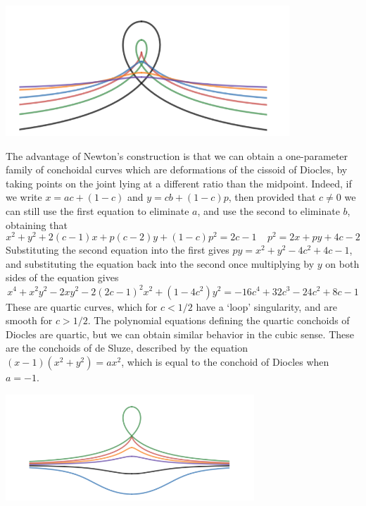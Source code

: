 \begin{example}
    \begin{center}
        \includegraphics[width=0.8\textwidth]{ConchoidDiocles2}
    \end{center}
    The advantage of Newton's construction is that we can obtain a one-parameter family of conchoidal curves which are deformations of the cissoid of Diocles, by taking points on the joint lying at a different ratio than the midpoint. Indeed, if we write $x = ac + (1 - c)$ and $y = cb + (1 - c)p$, then provided that $c \neq 0$ we can still use the first equation to eliminate $a$, and use the second to eliminate $b$, obtaining that
    \[ x^2 + y^2 + 2(c-1)x + p(c-2)y + (1 - c)p^2 = 2c - 1\ \ \ \ \  p^2 = 2x + py + 4c - 2 \]
    Substituting the second equation into the first gives $py = x^2 + y^2 - 4c^2 + 4c - 1$, and substituting the equation back into the second once multiplying by $y$ on both sides of the equation gives
    \[ x^4 + x^2y^2  - 2xy^2 - 2(2c-1)^2x^2 + (1 - 4c^2)y^2 = -16c^4 + 32c^3 - 24c^2 + 8c - 1 \]
    These are quartic curves, which for $c < 1/2$ have a `loop' singularity, and are smooth for $c > 1/2$. The polynomial equations defining the quartic conchoids of Diocles are quartic, but we can obtain similar behavior in the cubic sense. These are the conchoids of de Sluze, described by the equation $(x-1)(x^2 + y^2) = ax^2$, which is equal to the conchoid of Diocles when $a = -1$.
    \begin{center}
        \includegraphics[width=0.7\textwidth]{ConchoidDesluze}
    \end{center}
\end{example}

